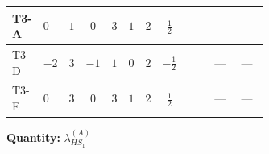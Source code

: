 \documentclass[8pt]{article}
\begin{document}
\begin{landscape}
\begin{longtable}{@{}llcccccc >{\raggedright\arraybackslash}p{0.21\linewidth} >{\raggedright\arraybackslash}p{0.21\linewidth} >{\raggedright\arraybackslash}p{0.21\linewidth}@{}}
\midrule
T3-A & $0$ & $1$ & $0$ & $3$ & $1$ & $2$ & $\frac{1}{2}$ & --- & --- & --- \\
\midrule
T3-D & $-2$ & $3$ & $-1$ & $1$ & $0$ & $2$ & $-\frac{1}{2}$ & \scriptsize\adjustbox{max width=\linewidth}{$\begin{gathered} -\frac{8}{3} {\lambda_5} \left({\lambda_5}\right)^{*}\end{gathered}$} & --- & --- \\
\midrule
T3-E & $0$ & $3$ & $0$ & $3$ & $1$ & $2$ & $\frac{1}{2}$ & \scriptsize\adjustbox{max width=\linewidth}{$\begin{gathered} -\frac{4}{3} {\lambda_5} \left({\lambda_5}\right)^{*}\end{gathered}$} & --- & --- \\
\midrule
\bottomrule
\end{longtable}
\clearpage
\noindent\textbf{Quantity: }$\lambda_{HS_1}^{(A)}$\par\smallskip

\end{landscape}
\end{document}

